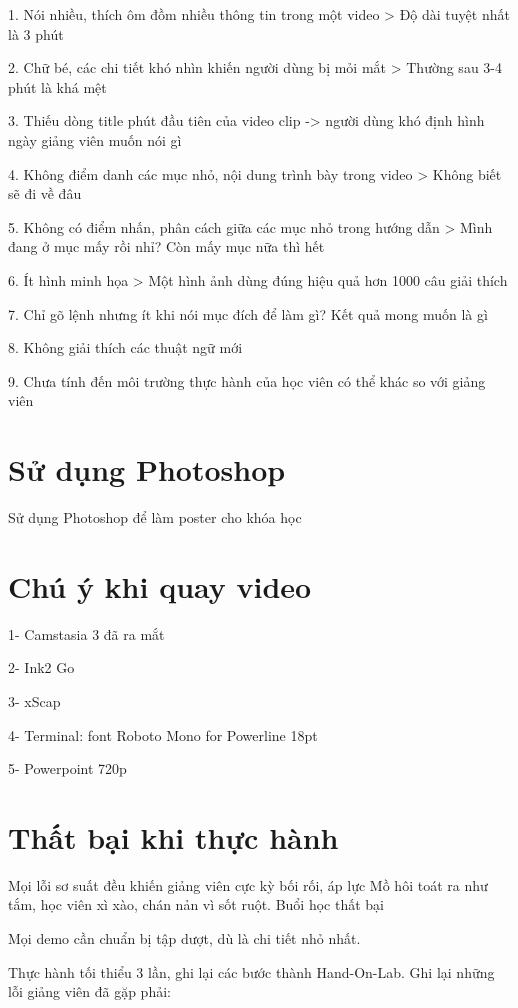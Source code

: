 1. Nói nhiều, thích ôm đồm nhiều thông tin trong một video > Độ dài tuyệt nhất là 3 phút

2. Chữ bé, các chi tiết khó nhìn khiến người dùng bị mỏi mắt > Thường sau 3-4 phút là khá mệt

3. Thiếu dòng title phút đầu tiên của video clip -> người dùng khó định hình ngày giảng viên muốn nói gì

4. Không điểm danh các mục nhỏ, nội dung trình bày trong video > Không biết sẽ đi về đâu

5. Không có điểm nhấn, phân cách giữa các mục nhỏ trong hướng dẫn > Mình đang ở mục mấy rồi nhỉ? Còn mấy mục nữa thì hết

6. Ít hình minh họa > Một hình ảnh dùng đúng hiệu quả hơn 1000 câu giải thích

7. Chỉ gõ lệnh nhưng ít khi nói mục đích để làm gì? Kết quả mong muốn là gì

8. Không giải thích các thuật ngữ mới

9. Chưa tính đến môi trường thực hành của học viên có thể khác so với giảng viên

\section{Sử dụng Photoshop}

Sử dụng Photoshop để làm poster cho khóa học

\section{Chú ý khi quay video}

1- Camstasia 3 đã ra mắt

2- Ink2 Go

3- xScap

4- Terminal: font Roboto Mono for Powerline 18pt

5- Powerpoint 720p

\section{Thất bại khi thực hành}

Mọi lỗi sơ suất đều khiến giảng viên cực kỳ bối rối, áp lực
Mồ hôi toát ra như tắm, học viên xì xào, chán nản vì sốt ruột. Buổi học thất bại

Mọi demo cần chuẩn bị tập dượt, dù là chi tiết nhỏ nhất.

Thực hành tối thiểu 3 lần, ghi lại các bước thành Hand-On-Lab.
Ghi lại những lỗi giảng viên đã gặp phải:

